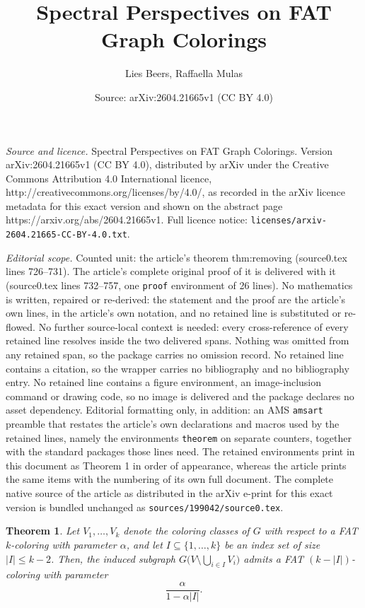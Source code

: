 \documentclass[10pt,a4paper]{amsart}
\title{Spectral Perspectives on FAT Graph Colorings}
\author{Lies Beers, Raffaella Mulas}
\date{Source: arXiv:2604.21665v1 (CC BY 4.0)}
\newtheorem{theorem}{Theorem}
\begin{document}
\maketitle

\noindent\emph{Source and licence.} Spectral Perspectives on FAT Graph Colorings. Version arXiv:2604.21665v1 (CC BY 4.0), distributed by arXiv under the Creative Commons Attribution 4.0 International licence, http://creativecommons.org/licenses/by/4.0/, as recorded in the arXiv licence metadata for this exact version and shown on the abstract page https://arxiv.org/abs/2604.21665v1. Full licence notice: \texttt{licenses/arxiv-2604.21665-CC-BY-4.0.txt}.\par\smallskip

\noindent\textit{Editorial scope.} Counted unit: the article's theorem thm:removing (source0.tex lines 726--731). The article's complete original proof of it is delivered with it (source0.tex lines 732--757, one \texttt{proof} environment of 26 lines). No mathematics is written, repaired or re-derived: the statement and the proof are the article's own lines, in the article's own notation, and no retained line is substituted or re-flowed.  No further source-local context is needed: every cross-reference of every retained line resolves inside the two delivered spans.  Nothing was omitted from any retained span, so the package carries no omission record.  No retained line contains a citation, so the wrapper carries no bibliography and no bibliography entry.  No retained line contains a figure environment, an image-inclusion command or drawing code, so no image is delivered and the package declares no asset dependency.  Editorial formatting only, in addition: an AMS \texttt{amsart} preamble that restates the article's own declarations and macros used by the retained lines, namely the environments \texttt{theorem} on separate counters, together with the standard packages those lines need.  The retained environments print in this document as Theorem 1 in order of appearance, whereas the article prints the same items with the numbering of its own full document.  The complete native source of the article as distributed in the arXiv e-print for this exact version is bundled unchanged as \texttt{sources/199042/source0.tex}.
\begin{theorem}\label{thm:removing}
    Let $V_1,\ldots,V_k$ denote the coloring classes of $G$ with respect to a FAT $k$-coloring with parameter $\alpha$, and let $I\subseteq \{1,\ldots,k\}$ be an index set of size $\lvert I\rvert\leq k-2$. Then, the induced subgraph $G\bigl(V\setminus\bigcup_{i\in I}V_i\bigr)$ admits a FAT $(k-\lvert I\rvert)$-coloring with parameter
    \[
        \frac{\alpha}{1-\alpha\lvert I\rvert}.
    \]
\end{theorem}
\end{document}
